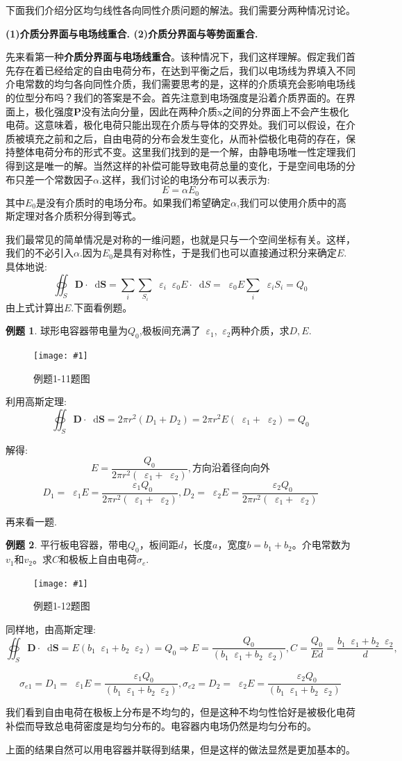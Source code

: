 \documentclass[12pt,a4paper,oneside]{report}
\theoremstyle{definition}
\newtheorem{example}{例题}[chapter]
\theoremstyle{remark}
\newcommand{\insertfig}[3]{
    \begin{figure}[ht]
        \centering
        \texttt{[image: \#1]}
        \caption{#2}
        \label{fig:#1}
    \end{figure}
}
\renewcommand{\d}{\mathop{}\!\mathrm{d}}
\renewcommand{\v}{\mathop{}\!\varepsilon}
\begin{document}
下面我们介绍分区均匀线性各向同性介质问题的解法。我们需要分两种情况讨论。

\textbf{(1)介质分界面与电场线重合.
(2)介质分界面与等势面重合.
}

先来看第一种\textbf{介质分界面与电场线重合}。该种情况下，我们这样理解。假定我们首先存在着已经给定的自由电荷分布，在达到平衡之后，我们以电场线为界填入不同介电常数的均匀各向同性介质，我们需要思考的是，这样的介质填充会影响电场线的位型分布吗？我们的答案是不会。首先注意到电场强度是沿着介质界面的。在界面上，极化强度$\mathbf{P}$没有法向分量，因此在两种介质x之间的分界面上不会产生极化电荷。这意味着，极化电荷只能出现在介质与导体的交界处。我们可以假设，在介质被填充之前和之后，自由电荷的分布会发生变化，从而补偿极化电荷的存在，保持整体电荷分布的形式不变。这里我们找到的是一个解，由静电场唯一性定理我们得到这是唯一的解。当然这样的补偿可能导致电荷总量的变化，于是空间电场的分布只差一个常数因子$\alpha$.这样，我们讨论的电场分布可以表示为:
\[
E = \alpha E_0
\]
其中$E_0$是没有介质时的电场分布。如果我们希望确定$\alpha$,我们可以使用介质中的高斯定理对各介质积分得到等式。

我们最常见的简单情况是对称的一维问题，也就是只与一个空间坐标有关。这样，我们的不必引入$\alpha$.因为$E_0$是具有对称性，于是我们也可以直接通过积分来确定$E$. 具体地说:
\[
\oiint_S \mathbf{D} \cdot \d \mathbf{S}  = \sum_i \sum_{S_i}\v_i \v_0 E \cdot \d S = \v_0 E \sum_i \v_i S_i
= Q_0
\]
由上式计算出$E$.下面看例题。

\begin{example}
球形电容器带电量为$Q_0$,极板间充满了$\v_1$,$\v_2$两种介质，求$D,E$.
\insertfig{1-2.png}{例题1-11题图}{0.25}

利用高斯定理:
\[
\oiint_S \mathbf{D} \cdot \d \mathbf{S}  = 2\pi r^2 (D_1+D_2) =2\pi r^2 E(\v_1+\v_2) = Q_0
\]

解得:
\[
E=\frac{Q_0}{2\pi r^2(\v_1+\v_2)}, \text{方向沿着径向向外}
\]
\[
D_1 = \v_1 E = \frac{\v_1 Q_0}{2\pi r^2(\v_1+\v_2)}, D_2 = \v_2 E = \frac{\v_2 Q_0}{2\pi r^2(\v_1+\v_2)}
\]

\end{example}
再来看一题.
\begin{example}
  平行板电容器，带电$Q_0$，板间距$d$，长度$a$，宽度$b=b_1+b_2$。介电常数为$v_1$和$v_2$。求$C$和极板上自由电荷$\sigma_e$.

  \insertfig{1-3.png}{例题1-12题图}{0.4}

  同样地，由高斯定理:
  \[
  \oiint_S \mathbf{D} \cdot \d \mathbf{S}  = E(b_1\v_1+b_2\v_2) = Q_0
  \Rightarrow E=\frac{Q_0}{(b_1\v_1+b_2\v_2)} , C  = \frac{Q_0}{Ed} = \frac{b_1\v_1+b_2\v_2}{d}, 
  \]

  \[
\sigma_{e1} = D_1 = \v_1 E = \frac{\v_1 Q_0}{(b_1\v_1+b_2\v_2)}, \sigma_{e2} = D_2 = \v_2 E = \frac{\v_2 Q_0}{(b_1\v_1+b_2\v_2)}
  \]

我们看到自由电荷在极板上分布是不均匀的，但是这种不均匀性恰好是被极化电荷补偿而导致总电荷密度是均匀分布的。电容器内电场仍然是均匀分布的。

上面的结果自然可以用电容器并联得到结果，但是这样的做法显然是更加基本的。
\end{example}
\end{document}
